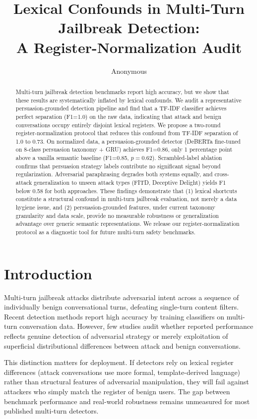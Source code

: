 \documentclass[11pt]{article}
\title{Lexical Confounds in Multi-Turn Jailbreak Detection:\\A Register-Normalization Audit}
\author{Anonymous}
\date{}
\begin{document}
\maketitle

\begin{abstract}
Multi-turn jailbreak detection benchmarks report high accuracy, but we show that these results are systematically inflated by lexical confounds. We audit a representative persuasion-grounded detection pipeline and find that a TF-IDF classifier achieves perfect separation (F1=1.0) on the raw data, indicating that attack and benign conversations occupy entirely disjoint lexical registers. We propose a two-round register-normalization protocol that reduces this confound from TF-IDF separation of 1.0 to 0.73. On normalized data, a persuasion-grounded detector (DeBERTa fine-tuned on 8-class persuasion taxonomy + GRU) achieves F1=0.86, only 1 percentage point above a vanilla semantic baseline (F1=0.85, $p=0.62$). Scrambled-label ablation confirms that persuasion strategy labels contribute no significant signal beyond regularization. Adversarial paraphrasing degrades both systems equally, and cross-attack generalization to unseen attack types (FITD, Deceptive Delight) yields F1 below 0.58 for both approaches. These findings demonstrate that (1) lexical shortcuts constitute a structural confound in multi-turn jailbreak evaluation, not merely a data hygiene issue, and (2) persuasion-grounded features, under current taxonomy granularity and data scale, provide no measurable robustness or generalization advantage over generic semantic representations. We release our register-normalization protocol as a diagnostic tool for future multi-turn safety benchmarks.
\end{abstract}

\section{Introduction}

Multi-turn jailbreak attacks distribute adversarial intent across a sequence of individually benign conversational turns, defeating single-turn content filters. Recent detection methods report high accuracy by training classifiers on multi-turn conversation data. However, few studies audit whether reported performance reflects genuine detection of adversarial strategy or merely exploitation of superficial distributional differences between attack and benign conversations.

This distinction matters for deployment. If detectors rely on lexical register differences (attack conversations use more formal, template-derived language) rather than structural features of adversarial manipulation, they will fail against attackers who simply match the register of benign users. The gap between benchmark performance and real-world robustness remains unmeasured for most published multi-turn detectors.
\end{document}
